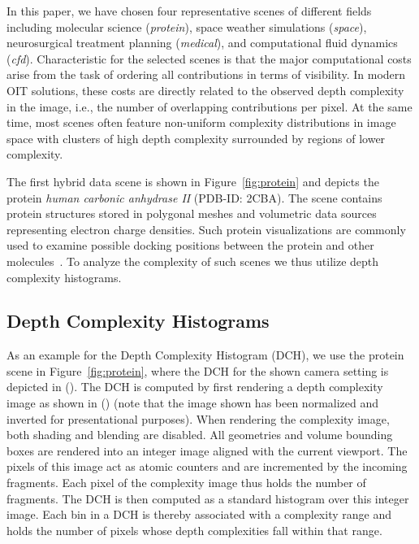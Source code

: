 \documentclass{egpubl}
\newcommand{\dch}{DCH}
\begin{document}
In this paper, we have chosen four representative scenes of different fields including molecular science (\emph{protein}), space weather simulations (\emph{space}), neurosurgical treatment planning (\emph{medical}), and computational fluid dynamics (\emph{cfd}). 
Characteristic for the selected scenes is that the major computational costs arise from the task of ordering all contributions in terms of visibility. 
In modern OIT solutions, these costs are directly related to the observed depth complexity in the image, i.e., the number of overlapping contributions per pixel. 
At the same time, most scenes often feature non-uniform complexity distributions in image space with clusters of high depth complexity surrounded by regions of lower complexity. 

%
The first hybrid data scene is shown in Figure~\ref{fig:protein} and depicts the protein \emph{human carbonic anhydrase II} (PDB-ID: 2CBA). 
The scene contains protein structures stored in polygonal meshes and volumetric data sources representing electron charge densities. 
Such protein visualizations are commonly used to examine possible docking positions between the protein and other molecules~\cite{Seeliger2010}. 
%
To analyze the complexity of such scenes we thus utilize depth complexity histograms.

\subsection{Depth Complexity Histograms}
\label{sec:dch}
   
As an example for the Depth Complexity Histogram (\dch), we use the protein scene in Figure~\ref{fig:protein}, where the DCH for the shown camera setting is depicted in (). 
The \dch{} is computed by first rendering a depth complexity image as shown in () (note that the image shown has been normalized and inverted for presentational purposes). 
When rendering the complexity image, both shading and blending are disabled. 
All geometries and volume bounding boxes are rendered into an integer image aligned with the current viewport. 
The pixels of this image act as atomic counters and are incremented by the incoming fragments. 
Each pixel of the complexity image thus holds the number of fragments. 
The \dch{} is then computed as a standard histogram over this integer image. 
Each bin in a \dch{} is thereby associated with a complexity range and holds the number of pixels whose depth complexities fall within that range. 
\end{document}
